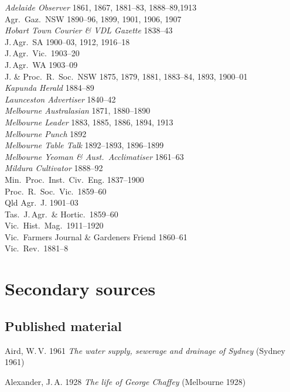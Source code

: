 \textit{Adelaide Observer} 1861, 1867, 1881--83, 1888--89,1913\\
Agr.\ Gaz.\ NSW  1890--96, 1899, 1901, 1906, 1907\\
\textit{Hobart Town Courier \& VDL Gazette} 1838--43\\ 
J.\,Agr.\ SA 1900--03, 1912, 1916--18\\
J.\,Agr.\ Vic.\ 1903--20\\
J.\,Agr.\ WA 1903--09\\
J. \& Proc.\ R.~Soc.\ NSW 1875, 1879, 1881, 1883--84, 1893, 1900--01\\
\textit{Kapunda Herald} 1884--89\\
\textit{Launceston Advertiser} 1840--42\\
\textit{Melbourne Australasian} 1871, 1880--1890\\
\textit{Melbourne Leader} 1883, 1885, 1886, 1894, 1913\\
\textit{Melbourne Punch} 1892\\
\textit{Melbourne Table Talk} 1892--1893, 1896--1899\\
\textit{Melbourne Yeoman \& Aust.\ Acclimatiser} 1861--63\\
\textit{Mildura Cultivator} 1888--92\\
Min.\ Proc.\ Inst.\ Civ.\ Eng. 1837--1900\\
Proc.\ R.~Soc.\ Vic.\ 1859--60\\
Qld Agr.\ J. 1901--03\\
Tas.\ J.\,Agr.\ \& Hortic.\  1859--60\\
Vic.\ Hist.\ Mag.\ 1911--1920\\
Vic.\ Farmers Journal \& Gardeners Friend 1860--61\\
Vic.\ Rev.\ 1881--8\\

\section*{Secondary sources}

\subsection*{Published material}

Aird, W.\,V. 1961 \textit{The water supply, sewerage and drainage of
Sydney} (Sydney 1961)

Alexander, J.\,A.  1928 \textit{The life of George Chaffey} (Melbourne
1928)

